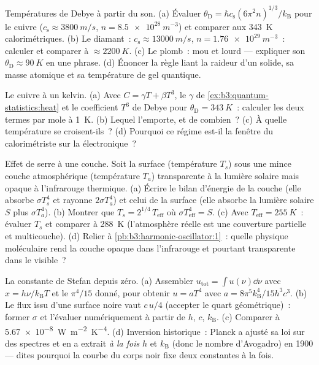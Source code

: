\begin{exercise}[$\star\star$]\label{exo:b3:photons-phonons:7}
Températures de Debye à partir du son. (a) Évaluer $\theta_{\text{D}} =
\hbar c_{\text{s}}(6\pi^2n)^{1/3}/k_{\text{B}}$ pour le cuivre
($c_{\text{s}} \approx \qty{3800}{m/s}$, $n =
\qty{8.5e28}{m^{-3}}$) et comparer aux \qty{343}{K}
calorimétriques. (b) Le diamant~: $c_{\text{s}} \approx
\qty{13000}{m/s}$, $n = \qty{1.76e29}{m^{-3}}$~: calculer et
comparer à $\approx\qty{2200}{K}$. (c) Le plomb~: mou et lourd ---
expliquer son $\theta_{\text{D}} \approx \qty{90}{K}$ en une
phrase. (d) Énoncer la règle liant la raideur d'un solide, sa masse
atomique et sa température de gel quantique.
\end{exercise}

\begin{exercise}[$\star\star$]\label{exo:b3:photons-phonons:8}
Le cuivre à un kelvin. (a) Avec $C = \gamma T + \beta T^3$, le
$\gamma$ de \cref{ex:b3:quantum-statistics:heat} et le coefficient
$T^3$ de Debye pour $\theta_{\text{D}} = \qty{343}{K}$~: calculer
les deux termes par mole à \qty{1}{K}. (b) Lequel l'emporte, et de
combien~? (c) À quelle température se croisent-ils~? (d) Pourquoi ce
régime est-il la fenêtre du calorimétriste sur la 
électronique~?
\end{exercise}

\begin{exercise}[$\star\star$]\label{exo:b3:photons-phonons:9}
Effet de serre à une couche. Soit la surface (température $T_s$)
sous une mince couche atmosphérique (température $T_a$) transparente
à la lumière solaire mais opaque à l'infrarouge thermique. (a)
Écrire le bilan d'énergie de la couche (elle absorbe $\sigma T_s^4$
et rayonne $2\sigma T_a^4$) et celui de la surface (elle absorbe la
lumière solaire $S$ plus $\sigma T_a^4$). (b) Montrer que
$T_s = 2^{1/4}\,T_{\text{eff}}$ où $\sigma T_{\text{eff}}^4 = S$.
(c) Avec $T_{\text{eff}} =
\qty{255}{K}$~: évaluer $T_s$ et comparer à \qty{288}{K}
(l'atmosphère réelle est une couverture partielle et
multicouche). (d) Relier à \cref{pb:b3:harmonic-oscillator:1}~:
quelle physique moléculaire rend la couche opaque dans l'infrarouge
et pourtant transparente dans le visible~?
\end{exercise}

\begin{exercise}[$\star\star\star$]\label{exo:b3:photons-phonons:10}
La constante de Stefan depuis zéro. (a) Assembler $u_{\text{tot}} =
\int u(\nu)\dd\nu$ avec $x = h\nu/k_{\text{B}}T$ et le $\pi^4/15$
donné, pour obtenir $u = aT^4$ avec $a =
8\pi^5k_{\text{B}}^4/15h^3c^3$. (b) Le flux issu d'une surface
noire vaut $c\,u/4$ (accepter le quart géométrique)~: former
$\sigma$ et l'évaluer numériquement à partir de $h$, $c$,
$k_{\text{B}}$. (c) Comparer à \qty{5.67e-8}{W.m^{-2}.K^{-4}}.
(d) Inversion historique~: Planck a ajusté sa loi sur des spectres
et en a extrait \emph{à la fois} $h$ et $k_{\text{B}}$ (donc le
nombre d'Avogadro) en 1900 --- dites pourquoi la courbe du corps
noir fixe deux constantes à la fois.
\end{exercise}

